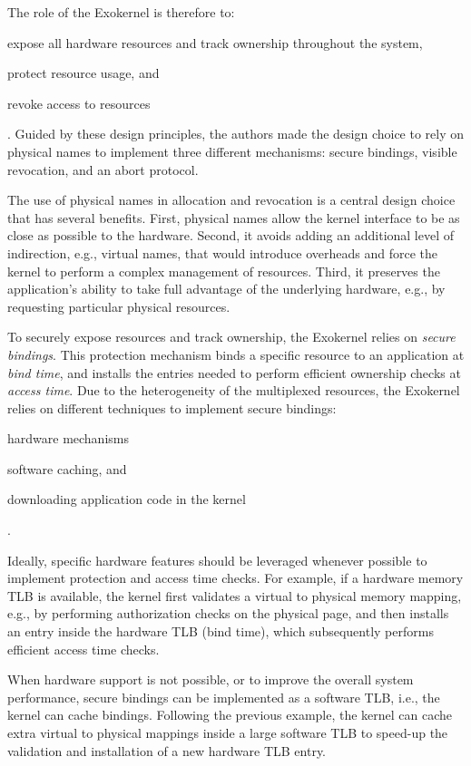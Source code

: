 The role of the Exokernel is therefore to:
\begin{enumerate*}
	\item \label{expose} expose all hardware resources and track ownership throughout the system,
	\item \label{protect} protect resource usage, and
	\item \label{revoke} revoke access to resources
\end{enumerate*}.
Guided by these design principles, the authors made the design choice to rely on physical names to implement three different mechanisms: secure bindings, visible revocation, and an abort protocol.

The use of physical names in allocation and revocation is a central design choice that has several benefits.
First, physical names allow the kernel interface to be as close as possible to the hardware.
Second, it avoids adding an additional level of indirection, e.g., virtual names, that would introduce overheads and force the kernel to perform a complex management of resources.
Third, it preserves the application's ability to take full advantage of the underlying hardware, e.g., by requesting particular physical resources.

To securely expose resources and track ownership, the Exokernel relies on \emph{secure bindings}.
This protection mechanism binds a specific resource to an application at \emph{bind time}, and installs the entries needed to perform efficient ownership checks at \emph{access time}.
Due to the heterogeneity of the multiplexed resources, the Exokernel relies on different techniques to implement secure bindings:
\begin{enumerate*}
	\item hardware mechanisms
	\item software caching, and
	\item downloading application code in the kernel
\end{enumerate*}.

Ideally, specific hardware features should be leveraged whenever possible to implement protection and access time checks.
For example, if a hardware memory TLB is available, the kernel first validates a virtual to physical memory mapping, e.g., by performing authorization checks on the physical page, and then installs an entry inside the hardware TLB (bind time), which subsequently performs efficient access time checks.

When hardware support is not possible, or to improve the overall system performance, secure bindings can be implemented as a software TLB, i.e., the kernel can cache bindings.
Following the previous example, the kernel can cache extra virtual to physical mappings inside a large software TLB to speed-up the validation and installation of a new hardware TLB entry.

